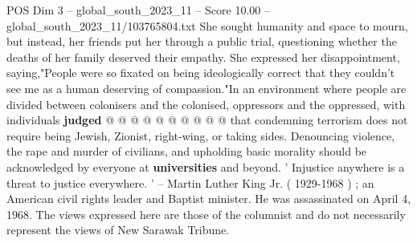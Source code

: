 \begin{textsample}{POS Dim 3 – global\_south\_2023\_11 – Score 10.00 – global\_south\_2023\_11/103765804.txt}
She sought humanity and space to mourn, but instead, her friends put her through a public trial, questioning whether the deaths of her family deserved their empathy.
She expressed her disappointment, saying,"People were so fixated on being ideologically correct that they couldn't see me as a human deserving of compassion."In an environment where people are divided between colonisers and the colonised, oppressors and the oppressed, with individuals \textbf{judged} @ @ @ @ @ @ @ @ @ @ that condemning terrorism does not require being Jewish, Zionist, right-wing, or taking sides.
Denouncing violence, the rape and murder of civilians, and upholding basic morality should be acknowledged by everyone at \textbf{universities} and beyond. ' Injustice anywhere is a threat to justice everywhere. ' -- Martin Luther King Jr. ( 1929-1968 ) ; an American civil rights leader and Baptist minister.
He was assassinated on April 4, 1968.
The views expressed here are those of the columnist and do not necessarily represent the views of New Sarawak Tribune.

\end{textsample}
